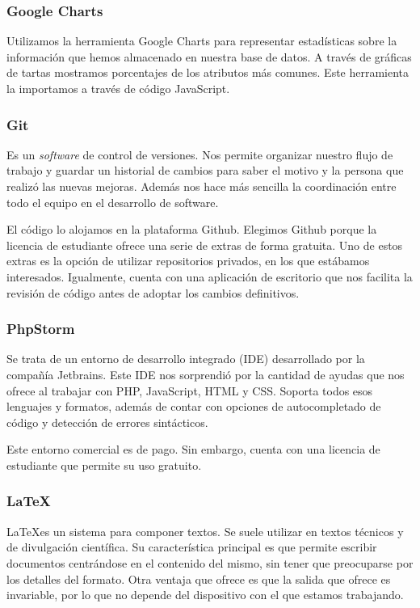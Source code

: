 \subsubsection{Google Charts}

Utilizamos la herramienta Google Charts \cite{GoogleCharts} para representar estadísticas sobre la información que hemos almacenado en nuestra base de datos. A través de gráficas de tartas mostramos porcentajes de los atributos más comunes. Este herramienta la importamos a través de código JavaScript. \par 

\subsubsection{Git}

Es un \textit{software} de control de versiones. Nos permite organizar nuestro flujo de trabajo y guardar un historial de cambios para saber el motivo y la persona que realizó las nuevas mejoras. Además nos hace más sencilla la coordinación entre todo el equipo en el desarrollo de software. \par 

El código lo alojamos en la plataforma Github. Elegimos Github porque la licencia de estudiante ofrece una serie de extras de forma gratuita. Uno de estos extras es la opción de utilizar repositorios privados, en los que estábamos interesados. Igualmente, cuenta con una aplicación de escritorio que nos facilita la revisión de código antes de adoptar los cambios definitivos. \par 

\subsubsection{PhpStorm}

Se trata de un entorno de desarrollo integrado (IDE) desarrollado por la compañía Jetbrains. Este IDE nos sorprendió por la cantidad de ayudas que nos ofrece al trabajar con PHP, JavaScript, HTML y CSS. Soporta todos esos lenguajes y formatos, además de contar con opciones de autocompletado de código y detección de errores sintácticos. \par 

Este entorno comercial es de pago. Sin embargo, cuenta con una licencia de estudiante que permite su uso gratuito. \par 

\subsubsection{\LaTeX}
\LaTeX\space es un sistema para componer textos. Se suele utilizar en textos técnicos y de divulgación científica. Su característica principal es que permite escribir documentos centrándose en el contenido del mismo, sin tener que preocuparse por los detalles del formato. Otra ventaja que ofrece es que la salida que ofrece es invariable, por lo que no depende del dispositivo con el que estamos trabajando. \par 

